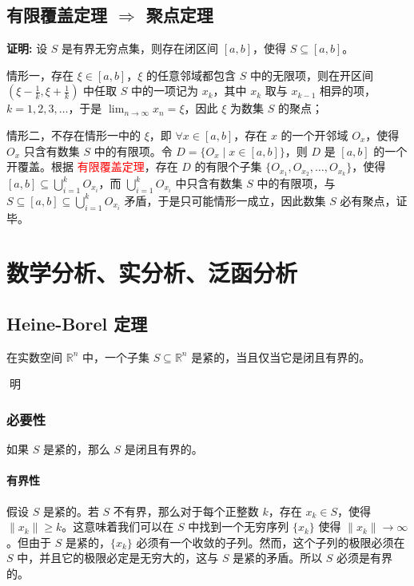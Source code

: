 \documentclass[lang=cn,newtx,10pt,scheme=chinese]{elegantbook}
\begin{document}
\section*{有限覆盖定理 $\Rightarrow$ 聚点定理}

\textbf{证明:} 设 $S$ 是有界无穷点集，则存在闭区间 $[a, b]$，使得 $S \subseteq [a, b]$。

情形一，存在 $\xi \in [a, b]$，$\xi$ 的任意邻域都包含 $S$ 中的无限项，则在开区间 $\left(\xi - \frac{1}{k}, \xi + \frac{1}{k}\right)$ 中任取 $S$ 中的一项记为 $x_k$，其中 $x_k$ 取与 $x_{k-1}$ 相异的项，$k = 1, 2, 3, \ldots$，于是 $\lim_{n \to \infty} x_n = \xi$，因此 $\xi$ 为数集 $S$ 的聚点；

情形二，不存在情形一中的 $\xi$，即 $\forall x \in [a, b]$，存在 $x$ 的一个开邻域 $O_x$，使得 $O_x$ 只含有数集 $S$ 中的有限项。令 $D = \{O_x \mid x \in [a, b]\}$，则 $D$ 是 $[a, b]$ 的一个开覆盖。根据 \textcolor{red}{有限覆盖定理}，存在 $D$ 的有限个子集 $\{O_{x_1}, O_{x_2}, \ldots, O_{x_k}\}$，使得 $[a, b] \subseteq \bigcup_{i=1}^{k} O_{x_i}$，而 $\bigcup_{i=1}^{k} O_{x_i}$ 中只含有数集 $S$ 中的有限项，与 $S \subseteq [a, b] \subseteq \bigcup_{i=1}^{k} O_{x_i}$ 矛盾，于是只可能情形一成立，因此数集 $S$ 必有聚点，证毕。

\chapter{数学分析、实分析、泛函分析}
\section*{Heine-Borel 定理}
在实数空间 $\mathbb{R}^n$ 中，一个子集 $S \subseteq \mathbb{R}^n$ 是紧的，当且仅当它是闭且有界的。

\t{证明}

\subsection*{必要性}
如果 $S$ 是紧的，那么 $S$ 是闭且有界的。

\subsubsection*{有界性}
假设 $S$ 是紧的。若 $S$ 不有界，那么对于每个正整数 $k$，存在 $x_k \in S$，使得 $\|x_k\| \ge k$。这意味着我们可以在 $S$ 中找到一个无穷序列 $\{x_k\}$ 使得 $\|x_k\| \to \infty$。但由于 $S$ 是紧的，$\{x_k\}$ 必须有一个收敛的子列。然而，这个子列的极限必须在 $S$ 中，并且它的极限必定是无穷大的，这与 $S$ 是紧的矛盾。所以 $S$ 必须是有界的。
\end{document}
